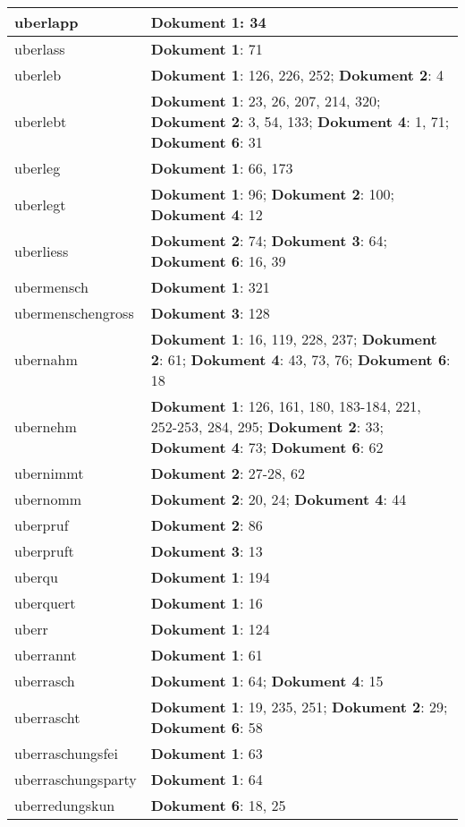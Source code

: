 \documentclass[a5paper]{article}
\begin{document}
\begin{longtable}[l]{|l|p{3in}|}
\hline
uberlapp & \textbf{Dokument 1}: 34 \\
\hline
uberlass & \textbf{Dokument 1}: 71 \\
\hline
uberleb & \textbf{Dokument 1}: 126, 226, 252; \textbf{Dokument 2}: 4 \\
\hline
uberlebt & \textbf{Dokument 1}: 23, 26, 207, 214, 320; \textbf{Dokument 2}: 3, 54, 133; \textbf{Dokument 4}: 1, 71; \textbf{Dokument 6}: 31 \\
\hline
uberleg & \textbf{Dokument 1}: 66, 173 \\
\hline
uberlegt & \textbf{Dokument 1}: 96; \textbf{Dokument 2}: 100; \textbf{Dokument 4}: 12 \\
\hline
uberliess & \textbf{Dokument 2}: 74; \textbf{Dokument 3}: 64; \textbf{Dokument 6}: 16, 39 \\
\hline
ubermensch & \textbf{Dokument 1}: 321 \\
\hline
ubermenschengross & \textbf{Dokument 3}: 128 \\
\hline
ubernahm & \textbf{Dokument 1}: 16, 119, 228, 237; \textbf{Dokument 2}: 61; \textbf{Dokument 4}: 43, 73, 76; \textbf{Dokument 6}: 18 \\
\hline
ubernehm & \textbf{Dokument 1}: 126, 161, 180, 183-184, 221, 252-253, 284, 295; \textbf{Dokument 2}: 33; \textbf{Dokument 4}: 73; \textbf{Dokument 6}: 62 \\
\hline
ubernimmt & \textbf{Dokument 2}: 27-28, 62 \\
\hline
ubernomm & \textbf{Dokument 2}: 20, 24; \textbf{Dokument 4}: 44 \\
\hline
uberpruf & \textbf{Dokument 2}: 86 \\
\hline
uberpruft & \textbf{Dokument 3}: 13 \\
\hline
uberqu & \textbf{Dokument 1}: 194 \\
\hline
uberquert & \textbf{Dokument 1}: 16 \\
\hline
uberr & \textbf{Dokument 1}: 124 \\
\hline
uberrannt & \textbf{Dokument 1}: 61 \\
\hline
uberrasch & \textbf{Dokument 1}: 64; \textbf{Dokument 4}: 15 \\
\hline
uberrascht & \textbf{Dokument 1}: 19, 235, 251; \textbf{Dokument 2}: 29; \textbf{Dokument 6}: 58 \\
\hline
uberraschungsfei & \textbf{Dokument 1}: 63 \\
\hline
uberraschungsparty & \textbf{Dokument 1}: 64 \\
\hline
uberredungskun & \textbf{Dokument 6}: 18, 25 \\

\end{longtable}
\end{document}
